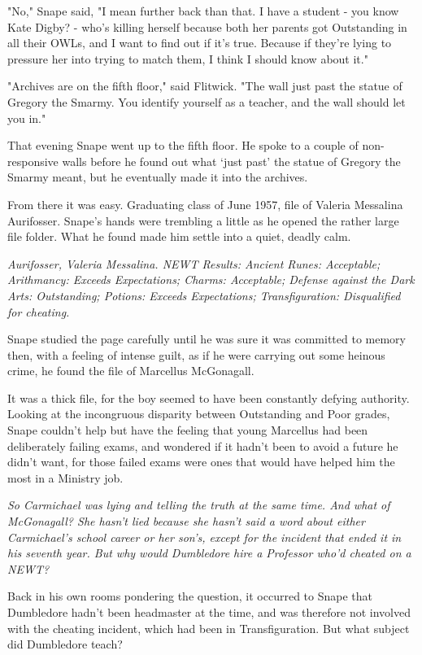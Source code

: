 \documentclass[a4paper,11pt]{article}
\begin{document}
"No," Snape said, "I mean further back than that. I have a student - you know Kate Digby? - who's killing herself because both her parents got Outstanding in all their OWLs, and I want to find out if it's true. Because if they're lying to pressure her into trying to match them, I think I should know about it."

"Archives are on the fifth floor," said Flitwick. "The wall just past the statue of Gregory the Smarmy. You identify yourself as a teacher, and the wall should let you in."

That evening Snape went up to the fifth floor. He spoke to a couple of non-responsive walls before he found out what `just past' the statue of Gregory the Smarmy meant, but he eventually made it into the archives.

From there it was easy. Graduating class of June 1957, file of Valeria Messalina Aurifosser. Snape's hands were trembling a little as he opened the rather large file folder. What he found made him settle into a quiet, deadly calm.

\emph{Aurifosser, Valeria Messalina. NEWT Results: Ancient Runes: Acceptable; Arithmancy: Exceeds Expectations; Charms: Acceptable; Defense against the Dark Arts: Outstanding; Potions: Exceeds Expectations; Transfiguration: Disqualified for cheating.}

Snape studied the page carefully until he was sure it was committed to memory then, with a feeling of intense guilt, as if he were carrying out some heinous crime, he found the file of Marcellus McGonagall.

It was a thick file, for the boy seemed to have been constantly defying authority. Looking at the incongruous disparity between Outstanding and Poor grades, Snape couldn't help but have the feeling that young Marcellus had been deliberately failing exams, and wondered if it hadn't been to avoid a future he didn't want, for those failed exams were ones that would have helped him the most in a Ministry job.

\emph{So Carmichael was lying and telling the truth at the same time. And what of McGonagall? She hasn't lied because she hasn't said a word about either Carmichael's school career or her son's, except for the incident that ended it in his seventh year. But why would Dumbledore hire a Professor who'd cheated on a NEWT?}

Back in his own rooms pondering the question, it occurred to Snape that Dumbledore hadn't been headmaster at the time, and was therefore not involved with the cheating incident, which had been in Transfiguration. But what subject did Dumbledore teach?
\end{document}
